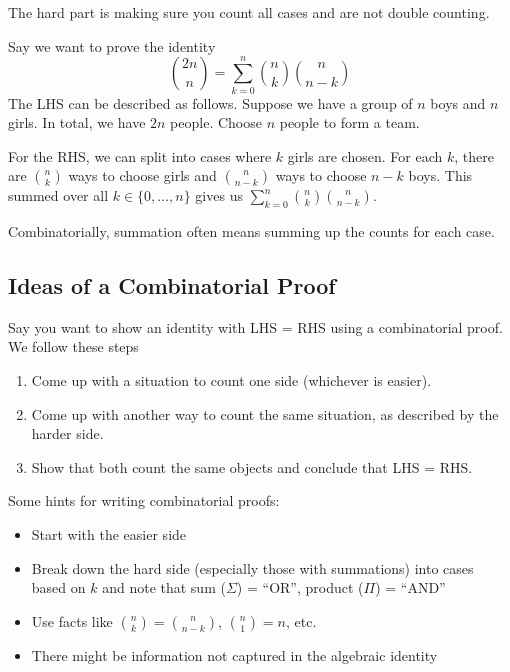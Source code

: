\begin{remark}
    The hard part is making sure you count all cases and are not double counting.
\end{remark}

\begin{example}
    Say we want to prove the identity
    $$
    \binom{2n}{n} = \sum_{k=0}^n \binom{n}{k} \binom{n}{n-k}
    $$
    The LHS can be described as follows. Suppose we have a group of $n$ boys and $n$ girls. In total, we have $2n$ people. Choose $n$ people to form a team.

    For the RHS, we can split into cases where $k$ girls are chosen. For each $k$, there are $\binom{n}{k}$ ways to choose girls and $\binom{n}{n-k}$ ways to choose $n-k$ boys. This summed over all $k \in \{0,\ldots,n\}$ gives us $\sum_{k=0}^n \binom{n}{k} \binom{n}{n-k}$.
\end{example}

\begin{remark}
    Combinatorially, summation often means summing up the counts for each case.
\end{remark}

\subsection{Ideas of a Combinatorial Proof}

Say you want to show an identity with LHS = RHS using a combinatorial proof. We follow these steps
\begin{enumerate}
    \item Come up with a situation to count one side (whichever is easier).
    \item Come up with another way to count the same situation, as described by the harder side.
    \item Show that both count the same objects and conclude that LHS = RHS.
\end{enumerate}

\begin{remark}
    Some hints for writing combinatorial proofs:
    \begin{itemize}
        \item Start with the easier side
        \item Break down the hard side (especially those with summations) into cases based on $k$ and note that sum ($\Sigma$) = ``OR'', product ($\Pi$) = ``AND''
        \item Use facts like $\binom{n}{k} = \binom{n}{n-k}$, $\binom{n}{1} = n$, etc.
        \item There might be information not captured in the algebraic identity
    \end{itemize}
\end{remark}

